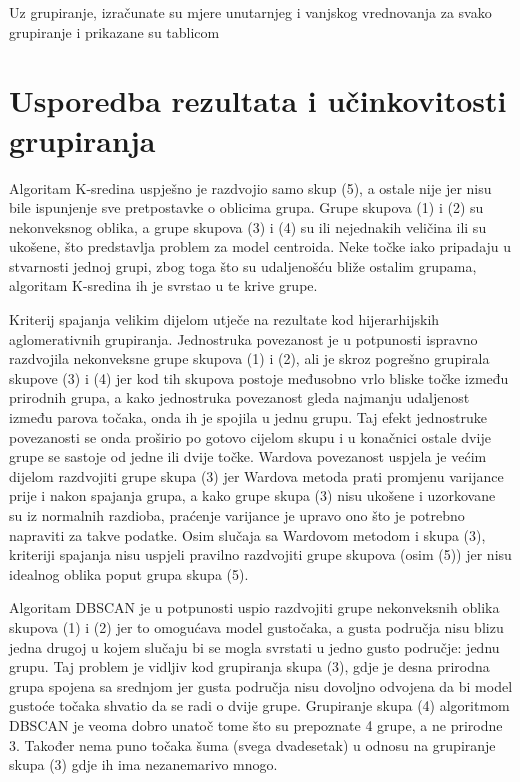 \documentclass[times, utf8, zavrsni]{fer}
\begin{document}
Uz grupiranje, izračunate su mjere unutarnjeg i vanjskog vrednovanja za svako grupiranje i prikazane su tablicom %

\section{Usporedba rezultata i učinkovitosti grupiranja}

Algoritam K-sredina uspješno je razdvojio samo skup (5), a ostale nije jer nisu bile ispunjenje sve pretpostavke o oblicima grupa. Grupe skupova (1) i (2) su nekonveksnog oblika, a grupe skupova (3) i (4) su ili nejednakih veličina ili su ukošene, što predstavlja problem za model centroida. Neke točke iako pripadaju u stvarnosti jednoj grupi, zbog toga što su udaljenošću bliže ostalim grupama, algoritam K-sredina ih je svrstao u te krive grupe.

Kriterij spajanja velikim dijelom utječe na rezultate kod hijerarhijskih aglomerativnih grupiranja. Jednostruka povezanost je u potpunosti ispravno razdvojila nekonveksne grupe skupova (1) i (2), ali je skroz pogrešno grupirala skupove (3) i (4) jer kod tih skupova postoje međusobno vrlo bliske točke između prirodnih grupa, a kako jednostruka povezanost gleda najmanju udaljenost između parova točaka, onda ih je spojila u jednu grupu. Taj efekt jednostruke povezanosti se onda proširio po gotovo cijelom skupu i u konačnici ostale dvije grupe se sastoje od jedne ili dvije točke. Wardova povezanost uspjela je većim dijelom razdvojiti grupe skupa (3) jer Wardova metoda prati promjenu varijance prije i nakon spajanja grupa, a kako grupe skupa (3) nisu ukošene i uzorkovane su iz normalnih razdioba, praćenje varijance je upravo ono što je potrebno napraviti za takve podatke. Osim slučaja sa Wardovom metodom i skupa (3), kriteriji spajanja nisu uspjeli pravilno razdvojiti grupe skupova (osim (5)) jer nisu idealnog oblika poput grupa skupa (5).

Algoritam DBSCAN je u potpunosti uspio razdvojiti grupe nekonveksnih oblika skupova (1) i (2) jer to omogućava model gustočaka, a gusta područja nisu blizu jedna drugoj u kojem slučaju bi se mogla svrstati u jedno gusto područje: jednu grupu. Taj problem je vidljiv kod grupiranja skupa (3), gdje je desna prirodna grupa spojena sa srednjom jer gusta područja nisu dovoljno odvojena da bi model gustoće točaka shvatio da se radi o dvije grupe. Grupiranje skupa (4) algoritmom DBSCAN je veoma dobro unatoč tome što su prepoznate 4 grupe, a ne prirodne 3. Također nema puno točaka šuma (svega dvadesetak) u odnosu na grupiranje skupa (3) gdje ih ima nezanemarivo mnogo.
\end{document}
